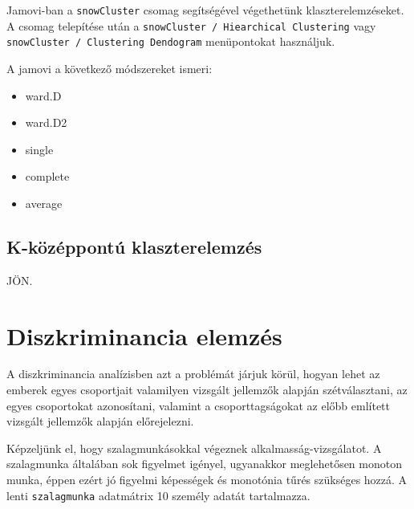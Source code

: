 \documentclass[
  letterpaper,
]{krantz}
\providecommand{\tightlist}{%
  \setlength{\itemsep}{0pt}\setlength{\parskip}{0pt}}\usepackage{longtable,booktabs,array}
\begin{document}
Jamovi-ban a \texttt{snowCluster} csomag segítségével végethetünk
klaszterelemzéseket. A csomag telepítése után a
\texttt{snowCluster\ /\ Hiearchical\ Clustering} vagy
\texttt{snowCluster\ /\ Clustering\ Dendogram} menüpontokat használjuk.

A jamovi a következő módszereket ismeri:

\begin{itemize}
\tightlist
\item
  ward.D
\item
  ward.D2
\item
  single
\item
  complete
\item
  average
\end{itemize}

\hypertarget{k-kuxf6zuxe9ppontuxfa-klaszterelemzuxe9s}{%
\section{K-középpontú
klaszterelemzés}\label{k-kuxf6zuxe9ppontuxfa-klaszterelemzuxe9s}}

JÖN.


\hypertarget{sec-diszkriminancia-elemzes}{%
\chapter{Diszkriminancia elemzés}\label{sec-diszkriminancia-elemzes}}

A diszkriminancia analízisben azt a problémát járjuk körül, hogyan lehet
az emberek egyes csoportjait valamilyen vizsgált jellemzők alapján
szétválasztani, az egyes csoportokat azonosítani, valamint a
csoporttagságokat az előbb említett vizsgált jellemzők alapján
előrejelezni.

Képzeljünk el, hogy szalagmunkásokkal végeznek alkalmasság-vizsgálatot.
A szalagmunka általában sok figyelmet igényel, ugyanakkor meglehetősen
monoton munka, éppen ezért jó figyelmi képességek és monotónia tűrés
szükséges hozzá. A lenti \texttt{szalagmunka} adatmátrix 10 személy
adatát tartalmazza.
\end{document}
